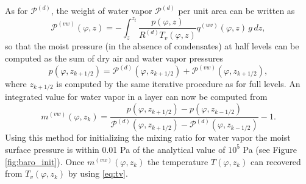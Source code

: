 \documentclass{agujournal}
\begin{document}
As for $\mathcal{P}^{(d)}$, the weight of water vapor $\mathcal{P}^{(d)}$ per unit area can be written as
\begin{equation}
{\mathcal{P}}^{(vw)}(\varphi,z)=-\int_z^{z_t}\frac{p(\varphi,z)}{R^{(d)} T_v(\varphi,z)}q^{(wv)}(\varphi,z)\, g\, dz,\label{eq:Upvw}
\end{equation}
so that the moist pressure (in the absence of condensates) at half levels can be computed as the sum of dry air and water vapor pressures
\begin{equation}
p(\varphi,z_{k+1/2})={\mathcal{P}}^{(d)}(\varphi,z_{k+1/2})+{\mathcal{P}}^{(vw)}(\varphi,z_{k+1/2}),
\end{equation}
where $z_{k+1/2}$ is computed by the same iterative procedure as for full levels. An integrated value for water vapor in a layer can now be computed from
\begin{equation}
m^{(vw)}(\varphi,z_k)=\frac{p(\varphi,z_{k+1/2})-p(\varphi,z_{k-1/2})}{{\mathcal{P}}^{(d)}(\varphi,z_{k+1/2})-{\mathcal{P}}^{(d)}(\varphi,z_{k-1/2})}-1.
\end{equation}
Using this method for initializing the mixing ratio for water vapor the moist surface pressure is within 0.01 Pa of the analytical value of $10^5$ Pa (see Figure \ref{fig:baro_init}). Once $m^{(vw)}(\varphi,z_k)$ the temperature $T(\varphi,z_k)$ can recovered from $T_v(\varphi,z_k)$ by using \eqref{eq:tv}.
\end{document}
